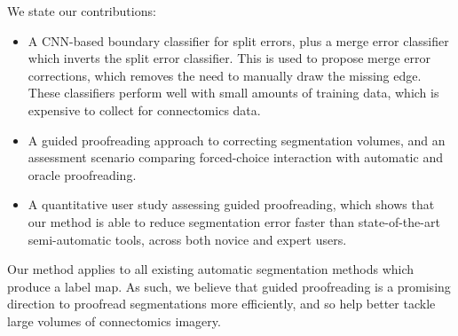 We state our contributions:
\begin{itemize}
\item A CNN-based boundary classifier for split errors, plus a merge error classifier which inverts the split error classifier. This is used to propose merge error corrections, which removes the need to manually draw the missing edge. These classifiers perform well with small amounts of training data, which is expensive to collect for connectomics data.
\item A guided proofreading approach to correcting segmentation volumes, and an assessment scenario comparing forced-choice interaction with automatic and oracle proofreading.
\item A quantitative user study assessing guided proofreading, which shows that our method is able to reduce segmentation error faster than state-of-the-art semi-automatic tools, across both novice and expert users.
\end{itemize}
Our method applies to all existing automatic segmentation methods which produce a label map. As such, we believe that guided proofreading is a promising direction to proofread segmentations more efficiently, and so help better tackle large volumes of connectomics imagery.

